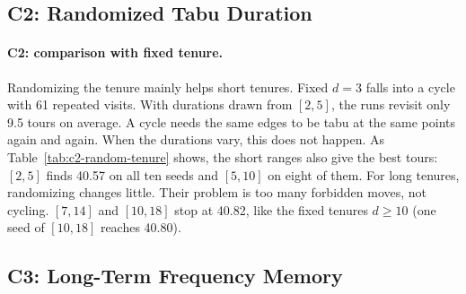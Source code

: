 \documentclass[11pt]{article}
\begin{document}
\subsection*{C2: Randomized Tabu Duration}

\begin{table}[H]
    \centering
    
    \caption{C2: results when the tabu duration is drawn uniformly from $[d_{min}, d_{max}]$ at each selected move, over seeds 0--9 (100 iterations, no frequency penalty).}
    \label{tab:c2-random-tenure}
\end{table}

\paragraph{C2: comparison with fixed tenure.}
Randomizing the tenure mainly helps short tenures. Fixed $d = 3$ falls into a cycle with 61 repeated visits. With durations drawn from $[2, 5]$, the runs revisit only 9.5 tours on average. A cycle needs the same edges to be tabu at the same points again and again. When the durations vary, this does not happen. As Table~\ref{tab:c2-random-tenure} shows, the short ranges also give the best tours: $[2, 5]$ finds 40.57 on all ten seeds and $[5, 10]$ on eight of them. For long tenures, randomizing changes little. Their problem is too many forbidden moves, not cycling. $[7, 14]$ and $[10, 18]$ stop at 40.82, like the fixed tenures $d \geq 10$ (one seed of $[10, 18]$ reaches 40.80).

\subsection*{C3: Long-Term Frequency Memory}

\begin{table}[H]
    \centering
    
    \caption{C3: effect of the frequency penalty weight $F$ ($d = 0$, 100 iterations).}
    \label{tab:c3-frequency-penalty}
\end{table}
\end{document}

